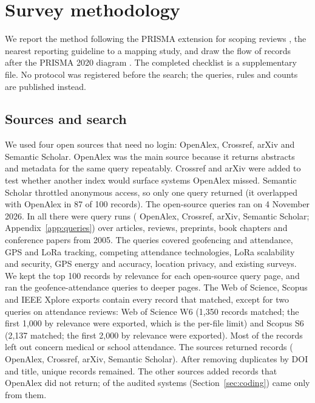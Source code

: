 \documentclass[12pt]{article}
\let\cite\citep
\begin{document}


\section{Survey methodology}\label{sec:method}
We report the method following the PRISMA extension for scoping reviews \cite{tricco2018prismascr}, the nearest reporting guideline to a mapping study, and draw the flow of records after the PRISMA 2020 diagram \cite{page2021prisma}. The completed checklist is a supplementary file. No protocol was registered before the search; the queries, rules and counts are published instead.

\subsection{Sources and search}
We used four open sources that need no login: OpenAlex, Crossref, arXiv and Semantic Scholar. OpenAlex was the main source because it returns abstracts and metadata for the same query repeatably. Crossref and arXiv were added to test whether another index would surface systems OpenAlex missed. Semantic Scholar throttled anonymous access, so only one query returned (it overlapped with OpenAlex in 87 of 100 records). \srcMissing{} The open-source queries ran on 4 November 2026. In all there were \nQueriesAll{} query runs (\nQueriesOA{} OpenAlex, \nQueriesCR{} Crossref, \nQueriesAX{} arXiv, \nQueriesSS{} Semantic Scholar\srcQueryExtra{}; Appendix~\ref{app:queries}) over articles, reviews, preprints, book chapters and conference papers from 2005. The queries covered geofencing and attendance, GPS and LoRa tracking, competing attendance technologies, LoRa scalability and security, GPS energy and accuracy, location privacy, and existing surveys. We kept the top 100 records by relevance for each open-source query page, and ran the geofence-attendance queries to deeper pages. The Web of Science, Scopus and IEEE Xplore exports contain every record that matched, except for two queries on attendance reviews: Web of Science W6 (1,350 records matched; the first 1,000 by relevance were exported, which is the per-file limit) and Scopus S6 (2,137 matched; the first 2,000 by relevance were exported). Most of the records left out concern medical or school attendance. The sources returned \totRetrieved{} records (\srcOA{} OpenAlex, \srcCR{} Crossref, \srcAX{} arXiv, \srcSS{} Semantic Scholar\srcRecordsExtra{}). After removing duplicates by DOI and title, \unionUnique{} unique records remained. The other sources added \newOther{} records that OpenAlex did not return; \nAuditOnlyOther{} of the \nAudit{} audited systems (Section~\ref{sec:coding}) came only from them.
\end{document}
